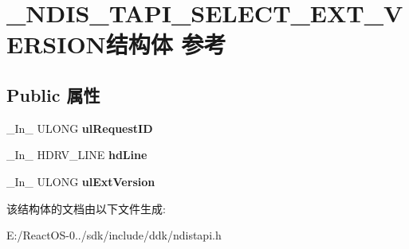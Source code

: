 \hypertarget{struct___n_d_i_s___t_a_p_i___s_e_l_e_c_t___e_x_t___v_e_r_s_i_o_n}{}\section{\+\_\+\+N\+D\+I\+S\+\_\+\+T\+A\+P\+I\+\_\+\+S\+E\+L\+E\+C\+T\+\_\+\+E\+X\+T\+\_\+\+V\+E\+R\+S\+I\+O\+N结构体 参考}
\label{struct___n_d_i_s___t_a_p_i___s_e_l_e_c_t___e_x_t___v_e_r_s_i_o_n}
\subsection*{Public 属性}
\begin{DoxyCompactItemize}
\item 
\mbox{\label{struct___n_d_i_s___t_a_p_i___s_e_l_e_c_t___e_x_t___v_e_r_s_i_o_n_ae1a51f06bb60393077dd3938c883aa93}} 
\+\_\+\+In\+\_\+ U\+L\+O\+NG {\bfseries ul\+Request\+ID}
\item 
\mbox{\label{struct___n_d_i_s___t_a_p_i___s_e_l_e_c_t___e_x_t___v_e_r_s_i_o_n_aff7b9ce0b654fc0f2355dd91d0a5cb81}} 
\+\_\+\+In\+\_\+ H\+D\+R\+V\+\_\+\+L\+I\+NE {\bfseries hd\+Line}
\item 
\mbox{\label{struct___n_d_i_s___t_a_p_i___s_e_l_e_c_t___e_x_t___v_e_r_s_i_o_n_acb1e69cf5a9336de0ea0934bd7111cac}} 
\+\_\+\+In\+\_\+ U\+L\+O\+NG {\bfseries ul\+Ext\+Version}
\end{DoxyCompactItemize}


该结构体的文档由以下文件生成\+:\begin{DoxyCompactItemize}
\item 
E\+:/\+React\+O\+S-\/0../sdk/include/ddk/ndistapi.\+h\end{DoxyCompactItemize}
